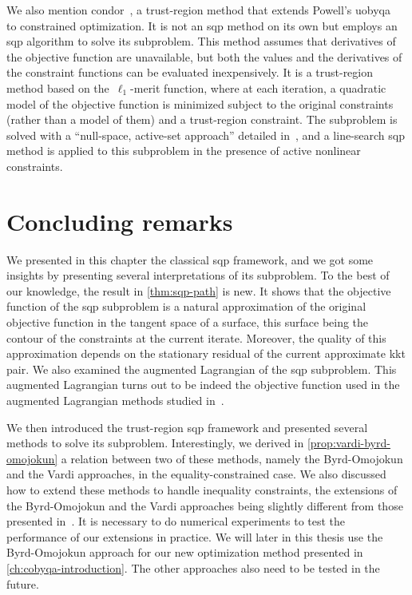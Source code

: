 We also mention \gls{condor}~\cite{Berghen_2004,Berghen_Bersini_2004}, a trust-region method that extends Powell's \gls{uobyqa}~\cite{Powell_2002} to constrained optimization.
It is not an \gls{sqp} method on its own but employs an \gls{sqp} algorithm to solve its subproblem.
This method assumes that derivatives of the objective function are unavailable, but both the values and the derivatives of the constraint functions can be evaluated inexpensively.
It is a trust-region method based on the~$\ell_1$-merit function, where at each iteration, a quadratic model of the objective function is minimized subject to the original constraints (rather than a model of them) and a trust-region constraint.
The subproblem is solved with a \enquote{null-space, active-set approach} detailed in~\cite[\S~9.3]{Berghen_2004}, and a line-search \gls{sqp} method is applied to this subproblem in the presence of active nonlinear constraints.

\section{Concluding remarks}

We presented in this chapter the classical \gls{sqp} framework, and we got some insights by presenting several interpretations of its subproblem.
To the best of our knowledge, the result in \cref{thm:sqp-path} is new.
It shows that the objective function of the \gls{sqp} subproblem is a natural approximation of the original objective function in the tangent space of a surface, this surface being the contour of the constraints at the current iterate.
Moreover, the quality of this approximation depends on the stationary residual of the current approximate \gls{kkt} pair.
We also examined the augmented Lagrangian of the \gls{sqp} subproblem.
This augmented Lagrangian turns out to be indeed the objective function used in the augmented Lagrangian methods studied in~\cite{Niu_Yuan_2010,Wang_Yuan_2014}.

We then introduced the trust-region \gls{sqp} framework and presented several methods to solve its subproblem.
Interestingly, we derived in \cref{prop:vardi-byrd-omojokun} a relation between two of  these methods, namely the Byrd-Omojokun and the Vardi approaches, in the equality-constrained case.
We also discussed how to extend these methods to handle inequality constraints, the extensions of the Byrd-Omojokun and the Vardi approaches being slightly different from those presented in~\cite[\S~15.4]{Conn_Gould_Toint_2000}.
It is necessary to do numerical experiments to test the performance of our extensions in practice.
We will later in this thesis use the Byrd-Omojokun approach for our new optimization method presented in \cref{ch:cobyqa-introduction}.
The other approaches also need to be tested in the future.
